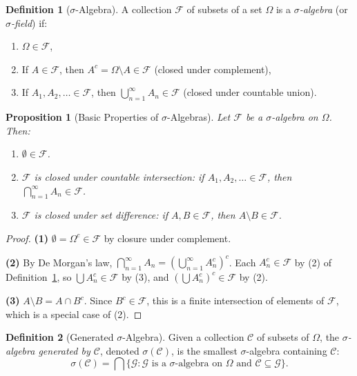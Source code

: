 \documentclass[11pt,a4paper]{article}
\theoremstyle{definition}
\newtheorem{definition}{Definition}[section]
\theoremstyle{plain}
\newtheorem{proposition}[theorem]{Proposition}
\theoremstyle{remark}
\begin{document}
\begin{definition}[$\sigma$-Algebra]
\label{def:sigma_algebra}
A collection $\mathcal{F}$ of subsets of a set $\Omega$ is a \emph{$\sigma$-algebra}
(or \emph{$\sigma$-field}) if:
\begin{enumerate}[nosep]
    \item $\Omega \in \mathcal{F}$,
    \item If $A \in \mathcal{F}$, then $A^c = \Omega \setminus A \in \mathcal{F}$ \hfill(closed under complement),
    \item If $A_1, A_2, \ldots \in \mathcal{F}$, then $\bigcup_{n=1}^\infty A_n \in \mathcal{F}$ \hfill(closed under countable union).
\end{enumerate}
\end{definition}

\begin{proposition}[Basic Properties of $\sigma$-Algebras]
\label{prop:sigma_props}
Let $\mathcal{F}$ be a $\sigma$-algebra on $\Omega$. Then:
\begin{enumerate}[nosep]
    \item $\emptyset \in \mathcal{F}$.
    \item $\mathcal{F}$ is closed under countable intersection: if $A_1, A_2, \ldots \in \mathcal{F}$, then $\bigcap_{n=1}^\infty A_n \in \mathcal{F}$.
    \item $\mathcal{F}$ is closed under set difference: if $A, B \in \mathcal{F}$, then $A \setminus B \in \mathcal{F}$.
\end{enumerate}
\end{proposition}

\begin{proof}
\textbf{(1)} $\emptyset = \Omega^c \in \mathcal{F}$ by closure under complement.

\textbf{(2)} By De Morgan's law, $\bigcap_{n=1}^\infty A_n = \left(\bigcup_{n=1}^\infty A_n^c\right)^c$. Each $A_n^c \in \mathcal{F}$ by (2) of Definition~\ref{def:sigma_algebra}, so $\bigcup A_n^c \in \mathcal{F}$ by (3), and $\left(\bigcup A_n^c\right)^c \in \mathcal{F}$ by (2).

\textbf{(3)} $A \setminus B = A \cap B^c$. Since $B^c \in \mathcal{F}$, this is a finite intersection of elements of $\mathcal{F}$, which is a special case of (2).
\end{proof}

\begin{definition}[Generated $\sigma$-Algebra]
\label{def:generated_sigma}
Given a collection $\mathcal{C}$ of subsets of $\Omega$, the \emph{$\sigma$-algebra generated by $\mathcal{C}$}, denoted $\sigma(\mathcal{C})$, is the smallest $\sigma$-algebra containing $\mathcal{C}$:
\begin{equation}
    \sigma(\mathcal{C}) = \bigcap \{ \mathcal{G} : \mathcal{G} \text{ is a $\sigma$-algebra on } \Omega \text{ and } \mathcal{C} \subseteq \mathcal{G} \}.
    \label{eq:generated_sigma}
\end{equation}
\end{definition}
\end{document}
